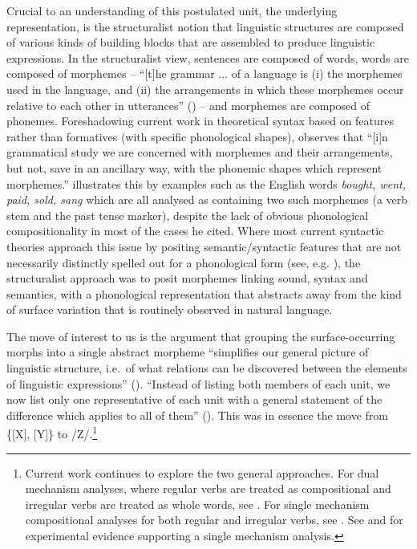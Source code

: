 Crucial to an understanding of this postulated unit, the underlying representation, is the structuralist notion that linguistic structures are composed of various kinds of building blocks that are assembled to produce linguistic expressions. In the structuralist view, sentences are composed of words, words are composed of morphemes --   ``[t]he grammar ... of a language is (i) the morphemes used in the language, and (ii) the arrangements in which these morphemes occur relative to each other in utterances'' (\citealt[129]{Hockett:1958}) -- and morphemes are composed of phonemes. Foreshadowing current work in theoretical syntax based on features rather than formatives (with specific phonological shapes), \citet[147]{Hockett:1958} observes that ``[i]n grammatical study we are concerned with morphemes and their arrangements, but not, save in an ancillary way, with the phonemic shapes which represent morphemes.'' \citet[271]{Hockett:1958} illustrates this by examples such as the English words {\it bought, went, paid, sold, sang}  which are all analysed as containing two such morphemes (a verb stem and the past tense marker), despite the lack of obvious phonological compositionality in most of the cases he cited. Where most current syntactic theories approach this issue by positing semantic/syntactic features that are not necessarily distinctly spelled out for a phonological form (see, e.g. \citealt{Pollock:1989}), the structuralist approach was to posit morphemes linking sound, syntax and semantics, with a phonological representation that abstracts away from the kind of surface variation  that is routinely observed in natural language.  

The move of interest to us is the argument that grouping the surface-occurring morphs into a single abstract  morpheme  ``simplifies our general picture of linguistic structure, i.e.\ of what relations can be discovered between the elements of linguistic expressions'' (\citealt[179]{Harris:1942}). ``Instead of listing both members of each unit, we now list only one representative of each unit with a general statement of the difference which applies to all of them'' (\citealt[173]{Harris:1942}). This was in essence the move from \{[X], [Y]\} to /Z/.\footnote{Current work continues to explore the two general approaches. For dual mechanism analyses, where regular verbs are treated as compositional and irregular verbs are treated as whole words, see \citet{Pinker+:1988, Pinker:1991}. For single mechanism compositional analyses for both regular and irregular verbs, see \citet{McClelland+:2002words, McClelland+:2002rules, Stockall+:2006}. See \citet{Albright+:2003} and \citet{Fruchter+:2013} for experimental evidence supporting a single mechanism analysis.} 


